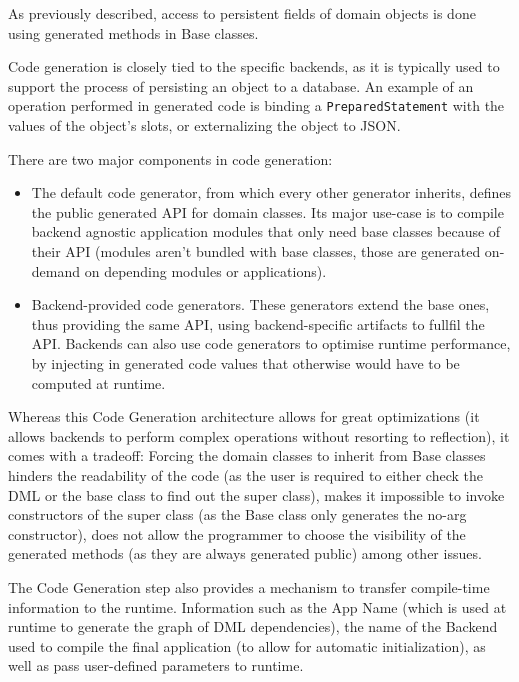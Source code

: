 \documentclass{llncs}
\begin{document}
As previously described, access to persistent fields of domain objects
is done using generated methods in Base classes.

Code generation is closely tied to the specific backends, as it is
typically used to support the process of persisting an object to a
database. An example of an operation performed in generated code is
binding a \texttt{PreparedStatement} with the values of the object's
slots, or externalizing the object to JSON.

There are two major components in code generation:

\begin{itemize}

\item The default code generator, from which every other generator
  inherits, defines the public generated API for domain classes. Its
  major use-case is to compile backend agnostic application modules
  that only need base classes because of their API (modules aren't
  bundled with base classes, those are generated on-demand on
  depending modules or applications).

\item Backend-provided code generators. These generators extend the
  base ones, thus providing the same API, using backend-specific
  artifacts to fullfil the API. Backends can also use code generators
  to optimise runtime performance, by injecting in generated code
  values that otherwise would have to be computed at runtime.
\end{itemize}

Whereas this Code Generation architecture allows for great
optimizations (it allows backends to perform complex operations
without resorting to reflection), it comes with a tradeoff: Forcing
the domain classes to inherit from Base classes hinders the
readability of the code (as the user is required to either check the
DML or the base class to find out the super class), makes it
impossible to invoke constructors of the super class (as the Base
class only generates the no-arg constructor), does not allow the
programmer to choose the visibility of the generated methods (as they
are always generated public) among other issues.

The Code Generation step also provides a mechanism to transfer
compile-time information to the runtime. Information such as the App
Name (which is used at runtime to generate the graph of DML
dependencies), the name of the Backend used to compile the final
application (to allow for automatic initialization), as well as pass
user-defined parameters to runtime.
\end{document}
